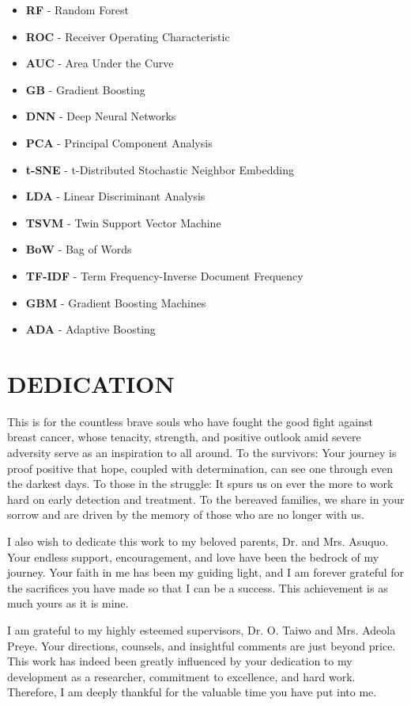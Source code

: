\documentclass[12pt, twoside]{report}
\begin{document}
\begin{itemize}
		\item \textbf{RF} - Random Forest 
		\item \textbf{ROC} - Receiver Operating Characteristic 
		\item \textbf{AUC} - Area Under the Curve 
		\item \textbf{GB} - Gradient Boosting 
		\item \textbf{DNN} - Deep Neural Networks 
		\item \textbf{PCA} - Principal Component Analysis 
		\item \textbf{t-SNE} - t-Distributed Stochastic Neighbor Embedding 
		\item \textbf{LDA} - Linear Discriminant Analysis 
		\item \textbf{TSVM} - Twin Support Vector Machine 
		\item \textbf{BoW} - Bag of Words 
		\item \textbf{TF-IDF} - Term Frequency-Inverse Document Frequency 
		\item \textbf{GBM} - Gradient Boosting Machines 
		\item \textbf{ADA} - Adaptive Boosting 
	\end{itemize}
	
	\chapter*{DEDICATION}
	This is for the countless brave souls who have fought the good fight against breast cancer, whose tenacity, strength, and positive outlook amid severe adversity serve as an inspiration to all around. To the survivors: Your journey is proof positive that hope, coupled with determination, can see one through even the darkest days. To those in the struggle: It spurs us on ever the more to work hard on early detection and treatment. To the bereaved families, we share in your sorrow and are driven by the memory of those who are no longer with us.
	
	I also wish to dedicate this work to my beloved parents, Dr. and Mrs. Asuquo. Your endless support, encouragement, and love have been the bedrock of my journey. Your faith in me has been my guiding light, and I am forever grateful for the sacrifices you have made so that I can be a success. This achievement is as much yours as it is mine.
	
	I am grateful to my highly esteemed supervisors, Dr. O. Taiwo and Mrs. Adeola Preye. Your directions, counsels, and insightful comments are just beyond price. This work has indeed been greatly influenced by your dedication to my development as a researcher, commitment to excellence, and hard work. Therefore, I am deeply thankful for the valuable time you have put into me.
	
\end{document}

